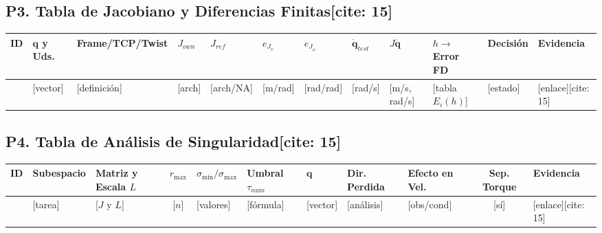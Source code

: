 \documentclass[10pt, a4paper]{article}
\begin{document}
\subsection*{P3. Tabla de Jacobiano y Diferencias Finitas[cite: 15]}
\noindent
{\tiny
\renewcommand{\arraystretch}{1.35}
\noindent\begin{tabularx}{\textwidth}{|l|X|l|l|l|l|l|l|l|X|l|X|}
\hline
\rowcolor{ucbblue!15}
\textbf{ID} & $\mathbf{q}$ \textbf{y Uds.} & \textbf{Frame/TCP/Twist} & $J_{own}$ & $J_{ref}$ & $e_{J_v}$ & $e_{J_\omega}$ & $\dot{\mathbf{q}}_{test}$ & $J\dot{\mathbf{q}}$ & $h \to$ \textbf{Error FD} & \textbf{Decisión} & \textbf{Evidencia} \\ \hline
[ID] & [vector] & [definición] & [arch] & [arch/NA] & [m/rad] & [rad/rad] & [rad/s] & [m/s, rad/s] & [tabla $E_i(h)$] & [estado] & [enlace][cite: 15] \\ \hline
\end{tabularx}
}

\subsection*{P4. Tabla de Análisis de Singularidad[cite: 15]}
\noindent
{\tiny
\renewcommand{\arraystretch}{1.35}
\noindent\begin{tabularx}{\textwidth}{|l|l|l|c|l|l|X|X|X|c|X|}
\hline
\rowcolor{ucbblue!15}
\textbf{ID} & \textbf{Subespacio} & \textbf{Matriz y Escala $L$} & $r_{\max}$ & $\sigma_{\min}/\sigma_{\max}$ & \textbf{Umbral $\tau_{num}$} & $\mathbf{q}$ & \textbf{Dir. Perdida} & \textbf{Efecto en Vel.} & \textbf{Sep. Torque} & \textbf{Evidencia} \\ \hline
[ID] & [tarea] & [$J$ y $L$] & [$n$] & [valores] & [fórmula] & [vector] & [análisis] & [obs/cond] & [sí] & [enlace][cite: 15] \\ \hline
\end{tabularx}
}
\end{document}
